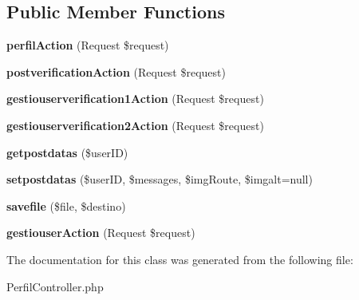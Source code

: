 \subsection*{Public Member Functions}
\begin{DoxyCompactItemize}
\item 
\mbox{\label{class_app_bundle_1_1_controller_1_1_perfil_controller_a7e36247a985d0625c5b6d8ea6879521a}} 
{\bfseries perfil\+Action} (Request \$request)
\item 
\mbox{\label{class_app_bundle_1_1_controller_1_1_perfil_controller_ac5f66db8ed52f11de13e915611f60eef}} 
{\bfseries postverification\+Action} (Request \$request)
\item 
\mbox{\label{class_app_bundle_1_1_controller_1_1_perfil_controller_adc2a62454d2de0f25f2c38066cdcb0c3}} 
{\bfseries gestiouserverification1\+Action} (Request \$request)
\item 
\mbox{\label{class_app_bundle_1_1_controller_1_1_perfil_controller_a5823a5118154765161b3d853fab610e2}} 
{\bfseries gestiouserverification2\+Action} (Request \$request)
\item 
\mbox{\label{class_app_bundle_1_1_controller_1_1_perfil_controller_a7936c97c37f8547df35c110ac69327ce}} 
{\bfseries getpostdatas} (\$user\+ID)
\item 
\mbox{\label{class_app_bundle_1_1_controller_1_1_perfil_controller_a50f7a2a6fc226360d3ecfeebbdc5b411}} 
{\bfseries setpostdatas} (\$user\+ID, \$messages, \$img\+Route, \$imgalt=null)
\item 
\mbox{\label{class_app_bundle_1_1_controller_1_1_perfil_controller_a944f6bcd563daa98d04cd2bd616fab57}} 
{\bfseries savefile} (\$file, \$destino)
\item 
\mbox{\label{class_app_bundle_1_1_controller_1_1_perfil_controller_ae2bf2b8b70bacf3a5ab0a30c6b8677ab}} 
{\bfseries gestiouser\+Action} (Request \$request)
\end{DoxyCompactItemize}


The documentation for this class was generated from the following file\+:\begin{DoxyCompactItemize}
\item 
Perfil\+Controller.\+php\end{DoxyCompactItemize}

